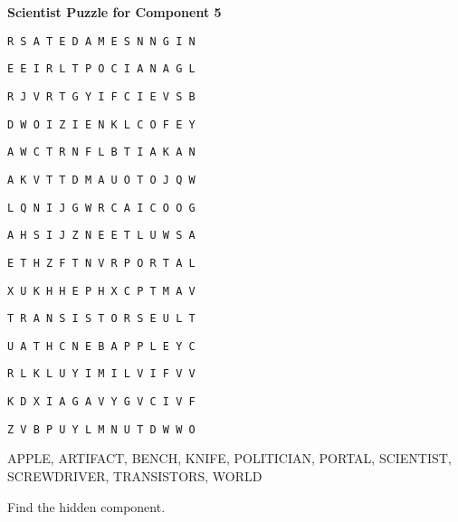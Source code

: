 \documentclass[white]{guildcamp3}
\begin{document}
\name{\wSciPuzzleFive{}} %

\large\textbf{Scientist Puzzle for Component 5}  

\texttt{R S A T E D A M E S N N G I N }

\texttt{E E I R L T P O C I A N A G L }

\texttt{R J V R T G Y I F C I E V S B }

\texttt{D W O I Z I E N K L C O F E Y }

\texttt{A W C T R N F L B T I A K A N }

\texttt{A K V T T D M A U O T O J Q W }

\texttt{L Q N I J G W R C A I C O O G }

\texttt{A H S I J Z N E E T L U W S A }

\texttt{E T H Z F T N V R P O R T A L }

\texttt{X U K H H E P H X C P T M A V }

\texttt{T R A N S I S T O R S E U L T }

\texttt{U A T H C N E B A P P L E Y C }

\texttt{R L K L U Y I M I L V I F V V }

\texttt{K D X I A G A V Y G V C I V F }

\texttt{Z V B P U Y L M N U T D W W O}

APPLE, ARTIFACT, BENCH, KNIFE, POLITICIAN, PORTAL, SCIENTIST, SCREWDRIVER, TRANSISTORS, WORLD

Find the hidden component.
\end{document}
